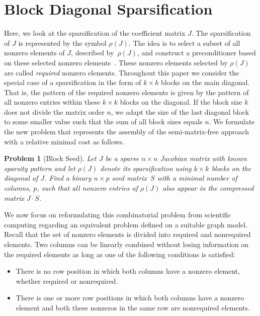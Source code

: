 \documentclass[12pt, twoside]{book}
\newtheorem{problem}{Problem}
\newcommand{\sparsifysymbol}{\ensuremath{\rho}}
\newcommand{\sparsify}[1]{\ensuremath{\sparsifysymbol(#1)}}
\begin{document}
\section{Block Diagonal Sparsification}
\label{s.block.diag.sp}
Here, we look at the sparsification of the coefficient matrix $J$. The
sparsification of $J$ is represented by the symbol \sparsify{J}. The idea is to select a
subset of all nonzero elements of $J$, described by~\sparsify{J}, and construct a
preconditioner based on these selected nonzero elements~\cite{Cullum2006}. These nonzero
elements selected by \sparsify{J} are called \emph{required} nonzero elements. Throughout
this paper we consider the special case of a sparsification in the form of $k\times k$
blocks on the main diagonal. That is, the pattern of the required nonzero elements is
given by the pattern of all nonzero entries within these $k\times k$ blocks on the
diagonal. If the block size $k$ does not divide the matrix order $n$, we adapt the size
of the last diagonal block to some smaller value such that the sum of all block sizes
equals $n$. We formulate the new problem that represents the assembly of the
semi-matrix-free approach with a relative minimal cost as follows.
%
\begin{problem}[Block Seed]
\label{p:block}
%
Let $J$ be a sparse $n \times n$ Jacobian matrix with known sparsity pattern and let
\sparsify{J} denote its sparsification using $k \times k$ blocks on the diagonal of $J$.
Find a binary $n \times p$ seed matrix~$S$ with a minimal number of columns, $p$, such
that all nonzero entries of \sparsify{J} also appear in the compressed matrix $J \cdot
S$.
\end{problem}

We now focus on reformulating this combinatorial problem from
scientific computing regarding an equivalent problem defined on a suitable graph model.
Recall that the set of nonzero elements is divided into required and nonrequired
elements. Two columns can be linearly combined without losing information on the
required elements as long as one of the following conditions is satisfied:
\begin{itemize}
\item There is no row position in which both columns have a nonzero element, whether
required or nonrequired.
\item There is one or more row positions in which both columns have a nonzero element
and both these nonzeros in the same row are nonrequired elements.
\end{itemize}
\end{document}
